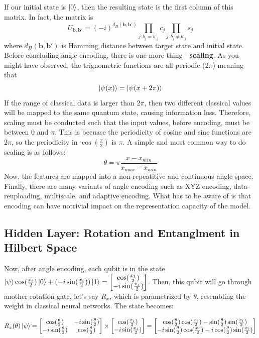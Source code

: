 \documentclass[12pt]{article}
\numberwithin{equation}{section}  %
\theoremstyle{definition}
\theoremstyle{plain}
\theoremstyle{remark}
\begin{document}
If our initial state is $\ket{0}$, then the resulting state is the first column of this matrix. In fact, the matrix is
\[U_{\mathbf{b,b'}}=(-i)^{d_H(\mathbf{b,b'})}\prod_{j:b_j=b'_j}c_j \prod_{j:b_j\neq b'_j}s_j\]
where $d_H(\mathbf{b,b'})$ is Hamming distance between target state and initial state. \\
Before concluding angle encoding, there is one more thing - \textbf{scaling}. As you might have observed, the trignometric functions are all periodic ($2\pi$) meaning that
\[\ket{\psi(x)}=\ket{\psi(x+2\pi)}\]
If the range of classical data is larger than $2\pi$, then two different classical values will be mapped to the same quantum state, causing information loss. Therefore, scaling must be conducted such that the input values, before encoding, must be between $0$ and $\pi$. This is becuase the periodicity of cosine and sine functions are $2\pi$, so the periodicity in $\cos(\frac{x}{2})$ is $\pi$. A simple and most common way to do scaling is as follows:
\[\theta=\pi\frac{x-x_{min}}{x_{max}-x_{min}}\]
Now, the features are mapped into a non-repeatitive and continuous angle space. Finally, there are many variants of angle encoding such as XYZ encoding, data-reuploading, multiscale, and adaptive encoding. What has to be aware of is that encoding can have notrivial impact on the representation capacity of the model. 

\subsection{Hidden Layer: Rotation and Entanglment in Hilbert Space}
Now, after angle encoding, each qubit is in the state $\ket{\psi}\cos(\frac{x_i}{2})\ket{0}+(-i\sin(\frac{x_i}{2}))\ket{1}=\begin{bmatrix}
\cos(\frac{x_1}{2})\\-i\sin(\frac{x_1}{2})\end{bmatrix}$. Then, this qubit will go through another rotation gate, let's say $R_x$, which is parametrized by $\theta$, resembling the weight in classical neural networks. The state becomes:

\[R_x(\theta)\ket{\psi}=\begin{bmatrix}\cos(\frac{\theta}{2})&-i\sin(\frac{\theta}{2})\\-i\sin(\frac{\theta}{2})&\cos(\frac{\theta}{2})\end{bmatrix}\times\begin{bmatrix}\cos(\frac{x_i}{2})\\-i\sin(\frac{x_i}{2})\end{bmatrix}=\begin{bmatrix}
\cos(\frac{\theta}{2})\cos(\frac{x_i}{2})-\sin(\frac{\theta}{2})\sin(\frac{x_i}{2})\\
-i\sin(\frac{\theta}{2})\cos(\frac{x_i}{2})-i\cos(\frac{\theta}{2})\sin(\frac{x_i}{2})
\end{bmatrix}\]
\end{document}
